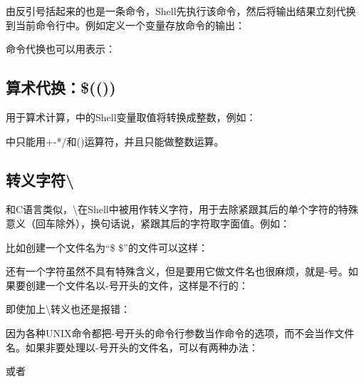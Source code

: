 由反引号括起来的也是一条命令，Shell先执行该命令，然后将输出结果立刻代换到当前命令行中。例如定义一个变量存放命令的输出：




命令代换也可以用\BookCode{\$(\BookSplit{})\BookSplit{}}表示：



\subsection{算术代换：\$(())}
%


用于算术计算，\BookCode{\$(\BookSplit{}(\BookSplit{})\BookSplit{})\BookSplit{}}中的Shell变量取值将转换成整数，例如：




\BookCode{\$(\BookSplit{}(\BookSplit{})\BookSplit{})\BookSplit{}}中只能用+-*/和()运算符，并且只能做整数运算。


\subsection{转义字符\textbackslash{}}
%


和C语言类似，\textbackslash{}在Shell中被用作转义字符，用于去除紧跟其后的单个字符的特殊意义（回车除外），换句话说，紧跟其后的字符取字面值。例如：




比如创建一个文件名为“\$ \$”的文件可以这样：




还有一个字符虽然不具有特殊含义，但是要用它做文件名也很麻烦，就是-号。如果要创建一个文件名以-号开头的文件，这样是不行的：




即使加上\textbackslash{}转义也还是报错：




因为各种UNIX命令都把-号开头的命令行参数当作命令的选项，而不会当作文件名。如果非要处理以-号开头的文件名，可以有两种办法：




或者




